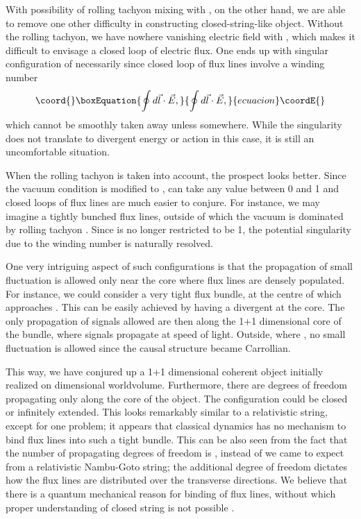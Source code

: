 \documentclass[a4paper,12pt]{article}
\begin{document}
With possibility of rolling tachyon mixing with \coordHE{}, on the other 
hand, we are able to remove one other difficulty in constructing
closed-string-like
object. Without the rolling tachyon, we have nowhere vanishing electric
field with \coordHE{},
which makes it difficult to envisage a closed loop of electric flux. 
One ends
up with singular configuration of \coordHE{} necessarily since closed
loop of flux lines involve a winding number 
\begin{equation}\coord{}\boxEquation{
\oint d\vec l \cdot \vec E ,
}{
\oint d\vec l \cdot \vec E ,
}{ecuacion}\coordE{}\end{equation}
which cannot be smoothly taken away unless \coordHE{} somewhere. While
the singularity does not translate to divergent energy or action
in this case, it is still an uncomfortable situation.

When the rolling tachyon is taken into account, the prospect looks
better.  
Since the vacuum condition is modified to \coordHE{},
\coordHE{} can take any value between 0 and 1 and closed loops of flux 
lines are much easier to conjure. For instance, we may imagine a tightly  
bunched flux lines, outside of which the vacuum is dominated by rolling 
tachyon \coordHE{}. Since \coordHE{} is no longer restricted to be 1, 
the potential singularity due to the winding number is naturally
resolved.  

One very intriguing aspect of such configurations is that
the  propagation
of small fluctuation is allowed only near the core where flux lines
are densely populated. For instance, we could consider a very tight
flux bundle, at the centre  of which \coordHE{} approaches \coordHE{}. This
can be easily achieved by having a divergent \myHighlight{$\vec \pi$}\coordHE{} at the core.
The only propagation of signals allowed are then along the 1+1 
dimensional core of the bundle, where signals propagate at speed of 
light. Outside, where \coordHE{}, no small fluctuation is allowed since
the causal structure became Carrollian.

This way, we have conjured up a 1+1 dimensional coherent object
initially realized on \coordHE{} dimensional worldvolume. Furthermore,
there are \coordHE{} degrees of freedom propagating only along the core 
of the object. The configuration could be closed or infinitely 
extended. This looks remarkably similar to a relativistic string,
except for one problem; it appears that classical dynamics has
no mechanism to bind flux lines into such a tight bundle. This can be
also seen from the fact that the number of propagating degrees of
freedom is  
\coordHE{}, instead of \coordHE{} we came to expect from a relativistic Nambu-Goto 
string; the additional degree of freedom dictates how the flux lines are
distributed over the transverse directions. We believe that there is
a quantum mechanical reason for binding of flux lines, without which
proper understanding of closed string is not possible \cite{yi,conf}.
\end{document}
